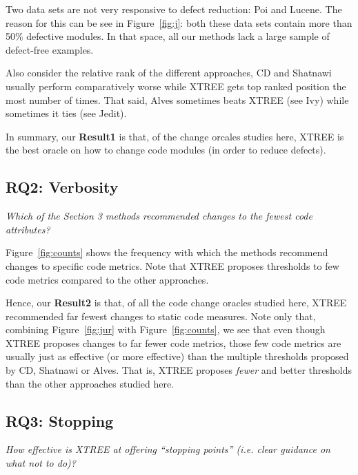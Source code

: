 \documentclass[twocolumn,5p]{elsarticle}
\newcommand{\fig}[1]{Figure~\ref{fig:#1}}
\theoremstyle{break}
\begin{document}
\begin{itemize}
		Two data sets are not very responsive to defect reduction:
		Poi and Lucene. The reason for this can be see in \fig{j}:
		both these data sets contain more than 50\% defective modules.
		In that space, all our  methods lack a large sample of
		defect-free examples. 
		
		Also consider the relative
		rank of the different approaches,
		CD and Shatnawi usually  perform comparatively worse while  XTREE gets top ranked position the most
		number of times. That said, Alves sometimes beats XTREE (see Ivy)
		while sometimes it ties (see Jedit).
		
		In summary, our {\bf Result1} is  that, of the change orcales studies here,
		XTREE is the best oracle on how to change code modules (in order to reduce defects).
		
		
		
		\subsection{RQ2: Verbosity}
		
		{\em Which of the Section 3 methods recommended changes to the fewest code attributes?}
		
		\fig{counts} shows the frequency with which the methods
		recommend changes to specific code metrics.
		Note that XTREE proposes thresholds to
		few code metrics compared to the other approaches. 
		
		
		Hence, our {\bf Result2} is that, of all the code change oracles studied here, XTREE recommended far fewest changes to static code measures.
		Note only that,   combining  \fig{jur} with \fig{counts}, we   see that
		even though XTREE proposes changes to far fewer code metrics, those few
		code metrics are usually just as effective (or
		more effective) than the multiple
		thresholds
		proposed by CD, Shatnawi or Alves.  That is, XTREE proposes
		{\em fewer} and better thresholds than the other approaches studied here.
		
		
		
		\subsection{RQ3: Stopping}
		
		{\em  How effective is XTREE at offering   ``stopping points'' (i.e. clear guidance on what not to do)?}
		

\end{itemize}
\end{document}
